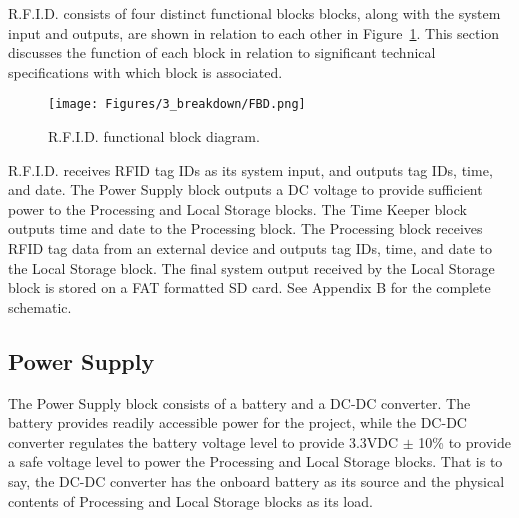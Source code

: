 R.F.I.D. consists of four distinct functional blocks \DIFdelbegin {}\DIFdelend \DIFaddbegin {}\DIFaddend blocks, along with the system input and outputs, are shown in relation to each other in Figure~\ref{fig:functional_diagram}. This section discusses the function of each block in relation to \DIFdelbegin {}\DIFdelend \DIFaddbegin {}\DIFaddend significant technical specifications with which \DIFdelbegin {}\DIFdelend \DIFaddbegin {}\DIFaddend block is associated.

\begin{figure}[H]
    \centering
    \texttt{[image: Figures/3\_breakdown/FBD.png]}
    \caption{R.F.I.D. functional block diagram.}
    \label{fig:functional_diagram}
\end{figure}



R.F.I.D. receives RFID tag IDs as its system input, and outputs tag IDs, time, and date. The Power Supply block outputs a DC voltage to provide sufficient power to the Processing and Local Storage blocks. The Time Keeper block outputs time and date to the Processing block. The Processing block receives RFID tag data from an external device \DIFdelbegin \DIFdel{, }\DIFdelend and outputs tag IDs, time, and date to the Local Storage block. The final system output received by the Local Storage block is stored on a FAT formatted SD card. See Appendix B for the complete schematic.


\subsection{Power Supply}

The Power Supply block consists of a battery and a DC-DC converter. The battery provides readily accessible power for the project, while the DC-DC converter regulates the battery voltage level to provide 3.3VDC $\pm$ 10\% to provide a safe voltage level to power the Processing and Local Storage blocks. That is to say, the DC-DC converter has the onboard battery as its source and the physical contents of Processing and Local Storage blocks as its load.

